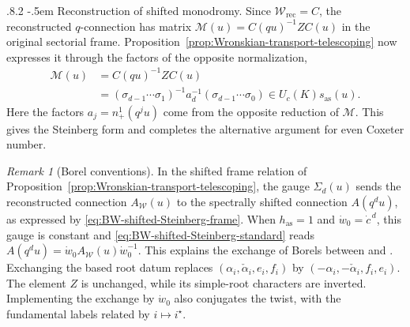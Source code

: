 \documentclass[11pt,leqno]{amsart}
\makeatletter
\numberwithin{equation}{section}
\renewcommand\paragraph{\@startsection{paragraph}{4}{\z@}%
  {.8\baselineskip \@plus .2\baselineskip}%
  {-.5em}%
  {\normalfont\normalsize\bfseries}}
\theoremstyle{plain}
\theoremstyle{definition}
\theoremstyle{plain}
\theoremstyle{definition}
\theoremstyle{remark}
\newtheorem{remark}[theorem]{Remark}
\makeatother
\begin{document}
\paragraph{Reconstruction of shifted monodromy.}
Since $\mathscr W_{\mathrm{rec}}=C$, the reconstructed $q$-connection has matrix $\mathscr M(u)=C(qu)^{-1}ZC(u)$ in the original sectorial frame.  Proposition~\ref{prop:Wronskian-transport-telescoping} now expresses it through the factors of the opposite normalization,
\begin{equation}\label{eq:appendix-differential-reconstruction}
 \begin{aligned}
 \mathscr M(u)
 &=C(qu)^{-1}ZC(u)\\
 &=\left(\sigma_{d-1}\cdots\sigma_1\right)^{-1}
     a_d^{-1}\left(\sigma_{d-1}\cdots\sigma_0\right)
   \in U_c(K)s_{\mathrm{as}}(u).
 \end{aligned}
\end{equation}
Here the factors $a_j=n_+^1(q^ju)$ come from the opposite reduction of $\mathscr M$.  This gives the Steinberg form and completes the alternative argument for even Coxeter number.

\begin{remark}[Borel conventions]\label{rem:forward-opposite-normal-forms}
In the shifted frame relation of Proposition~\ref{prop:Wronskian-transport-telescoping}, the gauge $\Sigma_d(u)$ sends the reconstructed connection $A_{\mathscr W}(u)$ to the spectrally shifted connection $A(q^du)$, as expressed by \eqref{eq:BW-shifted-Steinberg-frame}.  When $h_{\mathrm{as}}=1$ and $\dot w_0=\dot c^{\,d}$, this gauge is constant and \eqref{eq:BW-shifted-Steinberg-standard} reads $A(q^du)=\dot w_0A_{\mathscr W}(u)\dot w_0^{-1}$.  This explains the exchange of Borels between \cite{KZ2021} and \cite{FKSZ2020}.  Exchanging the based root datum replaces $(\alpha_i,\check\alpha_i,e_i,f_i)$ by $(-\alpha_i,-\check\alpha_i,f_i,e_i)$.  The element $Z$ is unchanged, while its simple-root characters are inverted.  Implementing the exchange by $\dot w_0$ also conjugates the twist, with the fundamental labels related by $i\mapsto i^\star$.
\end{remark}
\end{document}
